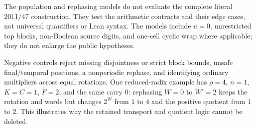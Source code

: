 The population and rephasing models do not evaluate the complete literal 2011/47 construction. They test the arithmetic contracts and their edge cases, not universal quantifiers or Lean syntax. The models include $u=0$, unrestricted top blocks, non-Boolean source digits, and one-cell cyclic wrap where applicable; they do not enlarge the public hypotheses.

Negative controls reject missing disjointness or strict block bounds, unsafe final/temporal positions, a nonperiodic rephase, and identifying ordinary multipliers across equal rotations. One reduced-radix example has $\rho=4$, $n=1$, $K=C=1$, $F=2$, and the same carry $0$: rephasing $W=0$ to $W'=2$ keeps the rotation and words but changes $2^W$ from $1$ to $4$ and the positive quotient from $1$ to $2$. This illustrates why the retained transport and quotient logic cannot be deleted.
